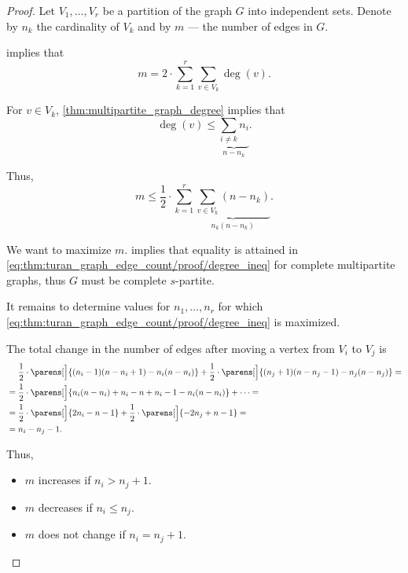 \begin{proof}
  Let \( V_1, \ldots, V_r \) be a partition of the graph \( G \) into independent sets. Denote by \( n_k \) the cardinality of \( V_k \) and by \( m \) --- the number of edges in \( G \).

   implies that
  \begin{equation*}
    m = 2 \cdot \sum_{k=1}^r \sum_{v \in V_k} \deg(v).
  \end{equation*}

  For \( v \in V_k \), \cref{thm:multipartite_graph_degree} implies that
  \begin{equation*}
    \deg(v) \leq \underbrace{\sum_{i \neq k} n_i}_{n - n_k}.
  \end{equation*}

  Thus,
  \begin{equation}\label{eq:thm:turan_graph_edge_count/proof/degree_ineq}
    m \leq \frac 1 2 \cdot \sum_{k=1}^r \underbrace{\sum_{v \in V_k} (n - n_k)}_{n_k (n - n_k)}.
  \end{equation}

  We want to maximize \( m \).  implies that equality is attained in \eqref{eq:thm:turan_graph_edge_count/proof/degree_ineq} for complete multipartite graphs, thus \( G \) must be complete \( s \)-partite.

  It remains to determine values for \( n_1, \ldots, n_r \) for which \eqref{eq:thm:turan_graph_edge_count/proof/degree_ineq} is maximized.

  The total change in the number of edges after moving a vertex from \( V_i \) to \( V_j \) is
  \begin{align*}
    &\phantom{{}={}}
    \frac 1 2 \cdot \parens[\Big]{ (n_i - 1)(n - n_i + 1) - n_i(n - n_i) } + \frac 1 2 \cdot \parens[\Big]{ (n_j + 1)(n - n_j - 1) - n_j(n - n_j) }
    = \\ &=
    \frac 1 2 \cdot \parens[\Big]{ n_i(n - n_i) + n_i - n + n_i - 1 - n_i(n - n_i) } + \cdots
    = \\ &=
    \frac 1 2 \cdot \parens[\Big]{ 2n_i - n - 1 } + \frac 1 2 \cdot \parens[\Big]{ -2n_j + n - 1 }
    = \\ &=
    n_i - n_j - 1.
  \end{align*}

  Thus,
  \begin{itemize}
    \item \( m \) increases if \( n_i > n_j + 1 \).
    \item \( m \) decreases if \( n_i \leq n_j \).
    \item \( m \) does not change if \( n_i = n_j + 1 \).
  \end{itemize}


\end{proof}
